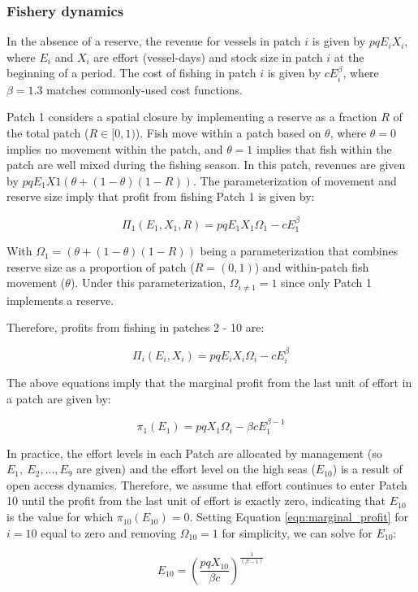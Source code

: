 \documentclass[12pt]{article}
\begin{document}
\subsubsection{Fishery dynamics}

In the absence of a reserve, the revenue for vessels in patch $i$ is given by $pqE_iX_i$, where $E_i$ and $X_i$ are effort (vessel-days) and stock size in patch $i$ at the beginning of a period. The cost of fishing in patch $i$ is given by $cE_i^\beta$, where $\beta = 1.3$ matches commonly-used cost functions.

Patch 1 considers a spatial closure by implementing a reserve as a fraction $R$ of the total patch ($R \in[0,1)$). Fish move within a patch based on $\theta$, where $\theta = 0$ implies no movement within the patch, and $\theta = 1$ implies that fish within the patch are well mixed during the fishing season. In this patch, revenues are given by $pqE_1X1(\theta + (1 - \theta)(1 - R))$. The parameterization of movement and reserve size imply that profit from fishing Patch 1 is given by:

$$
\Pi_1(E_1,X_1,R) = pqE_1X_1\Omega_1-cE_1^\beta
$$

With $\Omega_1 = (\theta + (1 - \theta)(1 - R))$ being a parameterization that combines reserve size as a proportion of patch ($R =  (0, 1)$) and within-patch fish movement ($\theta$). Under this parameterization, $\Omega_{i \neq 1} = 1$ since only Patch 1 implements a reserve.

Therefore, profits from fishing in patches 2 - 10 are:

$$
\Pi_i(E_i,X_i) = pqE_iX_i\Omega_i-cE_i^\beta
$$

The above equations imply that the marginal profit from the last unit of effort in a patch are given by:

$$
\pi_1(E_1) = pqX_1\Omega_i - \beta cE_1^{\beta-1}
\label{eqn:marginal_profit}
$$

In practice, the effort levels in each Patch are allocated by management (so $E_{1},\ E_{2},...,E_{9}$ are given) and the
effort level on the high seas ($E_{10}$) is a result of open access dynamics. Therefore, we assume that effort continues to enter Patch 10 until the profit from the last unit of effort is exactly zero, indicating that $E_{10}$ is the value for which $\pi_{10}(E_{10})  = 0$. Setting Equation \ref{eqn:marginal_profit} for $i = 10$ equal to zero and removing $\Omega_{10} = 1$ for simplicity, we can solve for $E_{10}$:

$$
E_{10} = \left(\frac{pqX_{10}}{\beta c}\right)^{\frac{1}{(\beta - 1)}}
\label{eqn:effort_hs}
$$
\end{document}
